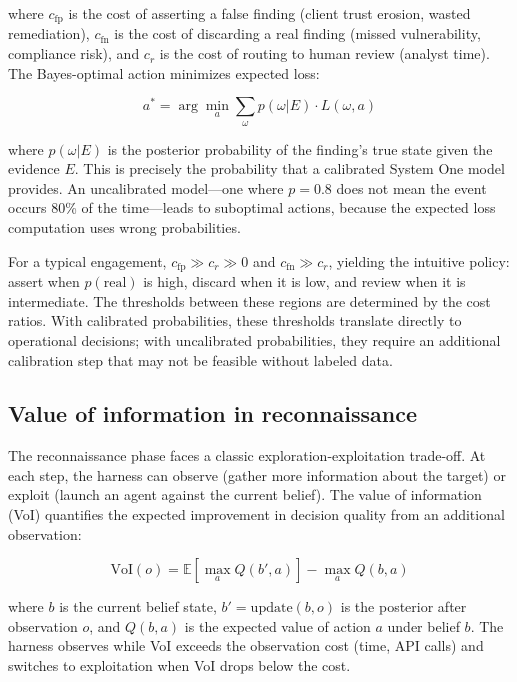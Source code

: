 \documentclass[conference]{IEEEtran}
\begin{document}
where $c_{\text{fp}}$ is the cost of asserting a false finding (client trust erosion, wasted remediation), $c_{\text{fn}}$ is the cost of discarding a real finding (missed vulnerability, compliance risk), and $c_r$ is the cost of routing to human review (analyst time). The Bayes-optimal action minimizes expected loss:

\begin{equation}
a^* = \arg\min_{a} \sum_{\omega} p(\omega | E) \cdot L(\omega, a)
\end{equation}

where $p(\omega | E)$ is the posterior probability of the finding's true state given the evidence $E$. This is precisely the probability that a calibrated System One model provides. An uncalibrated model---one where $p = 0.8$ does not mean the event occurs 80\% of the time---leads to suboptimal actions, because the expected loss computation uses wrong probabilities.

For a typical engagement, $c_{\text{fp}} \gg c_r \gg 0$ and $c_{\text{fn}} \gg c_r$, yielding the intuitive policy: assert when $p(\text{real})$ is high, discard when it is low, and review when it is intermediate. The thresholds between these regions are determined by the cost ratios. With calibrated probabilities, these thresholds translate directly to operational decisions; with uncalibrated probabilities, they require an additional calibration step that may not be feasible without labeled data.

\subsection{Value of information in reconnaissance}

The reconnaissance phase faces a classic exploration-exploitation trade-off. At each step, the harness can observe (gather more information about the target) or exploit (launch an agent against the current belief). The value of information (VoI) quantifies the expected improvement in decision quality from an additional observation:

\begin{equation}
\text{VoI}(o) = \mathbb{E}\left[ \max_a Q(b', a) \right] - \max_a Q(b, a)
\end{equation}

where $b$ is the current belief state, $b' = \text{update}(b, o)$ is the posterior after observation $o$, and $Q(b, a)$ is the expected value of action $a$ under belief $b$. The harness observes while VoI exceeds the observation cost (time, API calls) and switches to exploitation when VoI drops below the cost.
\end{document}
